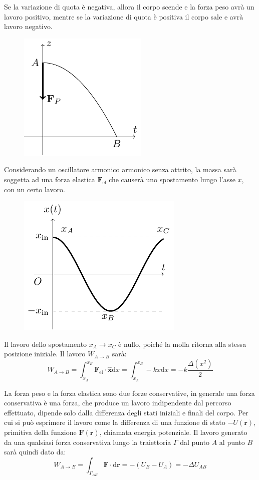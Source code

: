 \documentclass{article}
\newcommand{\vect}[1]{\boldsymbol{\mathbf{#1}}}
\newcommand{\df}{\mathrm{d}}
\numberwithin{equation}{subsection}
\begin{document}
Se la variazione di quota è negativa, allora il corpo 
scende e la forza peso avrà un lavoro positivo, mentre 
se la variazione di quota è positiva il corpo sale e avrà 
lavoro negativo.

\begin{figure}[H]%
    \centering
    \includegraphics{conservative-1.pdf}%
\end{figure}


Considerando un oscillatore armonico armonico senza attrito, la massa 
sarà soggetta ad una forza elastica $\vect{F}_{\mathrm{el}}$ che causerà uno 
spostamento lungo l'asse $x$, con un certo lavoro.
\begin{figure}[H]%
    \centering
    \includegraphics{conservative-2.pdf}%
\end{figure}
Il lavoro dello spostamento $x_A\to x_C$ è nullo, poiché la molla 
ritorna alla stessa posizione iniziale.  
Il lavoro $W_{A\to B}$ sarà:
\begin{equation}
    W_{A\to B}=\displaystyle\int_{x_A}^{x_B}\vect{F}_{\mathrm{el}}\cdot\hat{\vect{x}}\df x=\int_{x_A}^{x_B}-kx \df x=-k\frac{\Delta( x^{2})}{2}
\end{equation}

La forza peso e la forza elastica sono due forze conservative, in 
generale una forza conservativa è una forza, che produce un lavoro 
indipendente dal percorso effettuato, dipende solo dalla differenza degli stati iniziali 
e finali del corpo. Per cui si può esprimere il lavoro come la differenza di una funzione di stato $-U(\vect{r})$, primitiva della funzione $\vect{F}(\vect{r})$, 
chiamata energia potenziale. Il lavoro generato da una qualsiasi forza conservativa lungo 
la traiettoria $\Gamma$ dal punto $A$ al punto $B$ sarà quindi dato da: 
\begin{equation}
    W_{A\to B}=\displaystyle\int_{\Gamma_{AB}}\vect{F}\cdot \df\vect{r}=-\left(U_B-U_A\right)=-\Delta U_{AB}
\end{equation}
\end{document}
